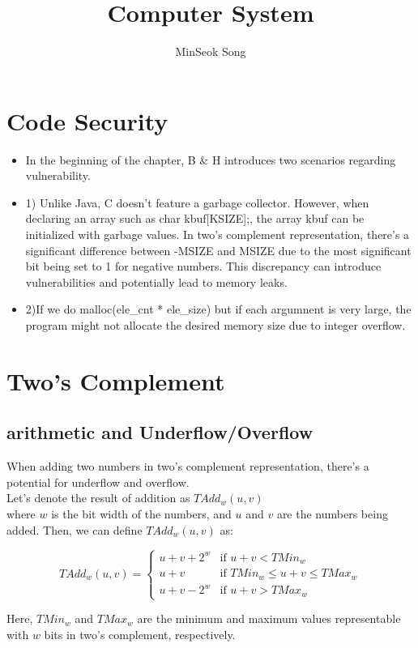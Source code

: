 \documentclass[11pt,reqno]{amsart}
\title{Computer System}
\author{MinSeok Song}
\date{}
\theoremstyle{remark}
\begin{document}
\maketitle

\section*{Code Security}
\begin{itemize}
    \item In the beginning of the chapter, B $\&$ H introduces two scenarios regarding vulnerability.
    \item 1) Unlike Java, C doesn't feature a garbage collector. However, when declaring an array such as char kbuf[KSIZE];, the array kbuf can be initialized with garbage values. 
    In two's complement representation, there's a significant difference between -MSIZE and MSIZE due 
    to the most significant bit being set to 1 for negative numbers. This discrepancy can introduce vulnerabilities and potentially lead to memory leaks.
    \item 2)If we do malloc(ele\_cnt * ele\_size) but if each argumnent is very large, the program might not allocate the desired memory size due to integer overflow.
\end{itemize}

\section*{Two's Complement}
\subsection*{arithmetic and Underflow/Overflow}
When adding two numbers in two's complement representation, there's a potential for underflow and overflow. \\
Let's denote the result of addition as \(TAdd_w(u,v)\) \\ where \(w\) is the bit width of the numbers, and \(u\) and \(v\) 
are the numbers being added. Then, we can define \(TAdd_w(u,v)\) as:

\[
TAdd_w(u,v) = 
\begin{cases} 
    u + v + 2^w & \text{if } u + v < TMin_w \\
    u + v & \text{if } TMin_w \leq u + v \leq TMax_w \\
    u + v - 2^w & \text{if } u + v > TMax_w
\end{cases}
\]

Here, \(TMin_w\) and \(TMax_w\) are the minimum and maximum values representable with \(w\) bits in two's complement, respectively.
\end{document}
